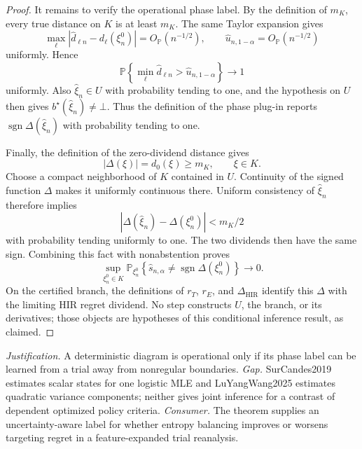 \documentclass{article}
\begin{document}
\begin{proof}
It remains to verify the operational phase label.  By the definition of \(m_K\), every true distance on \(K\) is at least \(m_K\).  The same Taylor expansion gives
\[
 \max_\ell|\widehat d_{\ell n}-d_\ell(\xi_n^0)|=O_{\mathbb P}(n^{-1/2}),
 \qquad
 \widehat u_{n,1-\alpha}=O_{\mathbb P}(n^{-1/2})
\]
uniformly.  Hence
\[
 \mathbb P\!\left\{
   \min_\ell\widehat d_{\ell n}>\widehat u_{n,1-\alpha}
 \right\}\longrightarrow1
\]
uniformly.  Also \(\widehat\xi_n\in U\) with probability tending to one, and the hypothesis on \(U\) then gives \(b^\star(\widehat\xi_n)\ne\bot\).  Thus the definition of the phase plug-in reports \(\operatorname{sgn}\Delta(\widehat\xi_n)\) with probability tending to one.

Finally, the definition of the zero-dividend distance gives
\[
 |\Delta(\xi)|=d_0(\xi)\ge m_K,
 \qquad \xi\in K.
\]
Choose a compact neighborhood of \(K\) contained in \(U\).  Continuity of the signed function \(\Delta\) makes it uniformly continuous there.  Uniform consistency of \(\widehat\xi_n\) therefore implies
\[
 |\Delta(\widehat\xi_n)-\Delta(\xi_n^0)|<m_K/2
\]
with probability tending uniformly to one.  The two dividends then have the same sign.  Combining this fact with nonabstention proves
\[
 \sup_{\xi_n^0\in K}\mathbb P_{\xi_n^0}\!\left\{
   \widehat s_{n,\alpha}\ne\operatorname{sgn}\Delta(\xi_n^0)
 \right\}\to0.
\]
On the certified branch, the definitions of \(r_T\), \(r_E\), and \(\Delta_{\mathrm{HIR}}\) identify this \(\Delta\) with the limiting HIR regret dividend.  No step constructs \(U\), the branch, or its derivatives; those objects are hypotheses of this conditional inference result, as claimed.
\end{proof}
\par\smallskip\noindent \textit{Justification.} A deterministic diagram is operational only if its phase label can be learned from a trial away from nonregular boundaries. \textit{Gap.} SurCandes2019 estimates scalar states for one logistic MLE and LuYangWang2025 estimates quadratic variance components; neither gives joint inference for a contrast of dependent optimized policy criteria. \textit{Consumer.} The theorem supplies an uncertainty-aware label for whether entropy balancing improves or worsens targeting regret in a feature-expanded trial reanalysis.
\end{document}
